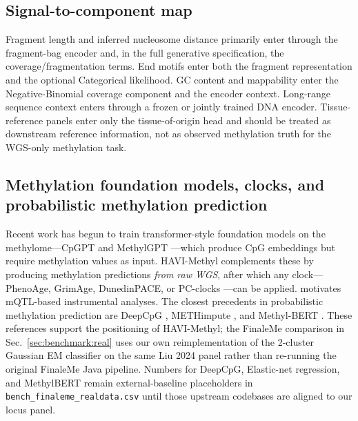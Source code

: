 \subsection{Signal-to-component map}
Fragment length and inferred nucleosome distance primarily enter through the fragment-bag encoder and, in the full generative specification, the coverage/fragmentation terms. End motifs enter both the fragment representation and the optional Categorical likelihood. GC content and mappability enter the Negative-Binomial coverage component and the encoder context. Long-range sequence context enters through a frozen or jointly trained DNA encoder. Tissue-reference panels enter only the tissue-of-origin head and should be treated as downstream reference information, not as observed methylation truth for the WGS-only methylation task.

\subsection{Methylation foundation models, clocks, and probabilistic methylation prediction}
Recent work has begun to train transformer-style foundation models on the methylome---CpGPT \citep{cpgpt2024} and MethylGPT \citep{methylgpt2024}---which produce CpG embeddings but require methylation values as input. HAVI-Methyl complements these by producing methylation predictions \emph{from raw WGS}, after which any clock---PhenoAge, GrimAge, DunedinPACE, or PC-clocks \citep{horvath2013,levine2018phenoage,lu2019grimage,belsky2022dunedinpace,higginschen2022pcclocks}---can be applied. \citet{ying2024causality} motivates mQTL-based instrumental analyses. The closest precedents in probabilistic methylation prediction are DeepCpG \citep{angermueller2017deepcpg}, METHimpute \citep{taudt2018methimpute}, and Methyl-BERT \citep{lee2018methylbert}. These references support the positioning of HAVI-Methyl; the FinaleMe comparison in Sec.~\ref{sec:benchmark:real} uses our own reimplementation of the 2-cluster Gaussian EM classifier on the same Liu 2024 panel rather than re-running the original FinaleMe Java pipeline. Numbers for DeepCpG, Elastic-net regression, and MethylBERT remain external-baseline placeholders in \texttt{bench\_finaleme\_realdata.csv} until those upstream codebases are aligned to our locus panel.

